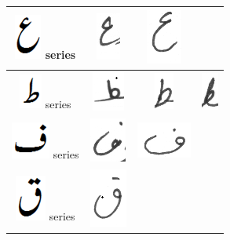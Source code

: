 \documentclass[a4paper,conference]{IEEEtran}
\begin{document}
\begin{table}[h]
\begin{tabular}{@{}cccc@{}}
\hline
\includegraphics[scale=0.15]{aien_orig} series & \includegraphics[scale=0.15]{aein} & \includegraphics[scale=0.10]{aein2}  &  \\
\hline
\includegraphics[scale=0.15]{tuay_orig} series & \includegraphics[scale=0.15]{tuin} & \includegraphics[scale=0.15]{tuin2}  & \includegraphics[scale=0.15]{zuin} \\
\hline
\includegraphics[scale=0.25]{fay_orig} series & \includegraphics[scale=0.25]{faay} & \includegraphics[scale=0.25]{23}  &  \\
\hline
\includegraphics[scale=0.20]{qaaf_orig} series & \includegraphics[scale=0.15]{kahf} & & \\

\end{tabular}
\end{table}
\end{document}

